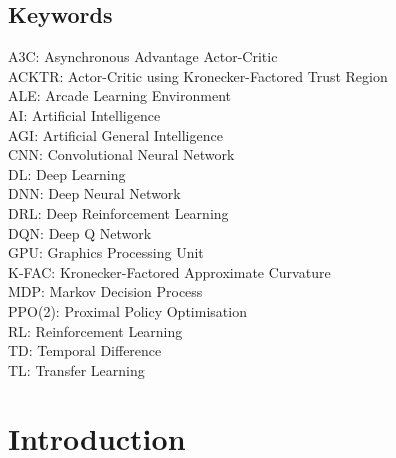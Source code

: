 


\maketitle

\subsection*{Keywords}
A3C: Asynchronous Advantage Actor-Critic\\
ACKTR: Actor-Critic using Kronecker-Factored Trust Region\\
ALE: Arcade Learning Environment\\
AI: Artificial Intelligence\\
AGI: Artificial General Intelligence\\
CNN: Convolutional Neural Network\\
DL: Deep Learning\\
DNN: Deep Neural Network\\
DRL: Deep Reinforcement Learning\\
DQN: Deep Q Network\\
GPU: Graphics Processing Unit\\
K-FAC: Kronecker-Factored Approximate Curvature\\
MDP: Markov Decision Process\\
PPO(2): Proximal Policy Optimisation\\
RL: Reinforcement Learning\\
TD: Temporal Difference\\
TL: Transfer Learning\\

\section{Introduction}

